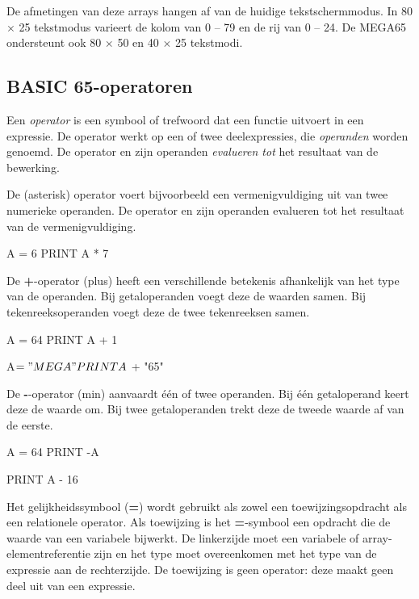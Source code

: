 De afmetingen van deze arrays hangen af van de huidige tekstschermmodus. In 80 $\times$ 25 tekstmodus varieert de kolom van 0 -- 79 en de rij van 0 -- 24. De MEGA65 ondersteunt ook 80 $\times$ 50 en 40 $\times$ 25 tekstmodi.

\subsection{BASIC 65-operatoren}

Een {\em operator} is een symbool of trefwoord dat een functie uitvoert in een expressie. De operator werkt op een of twee deelexpressies, die {\em operanden} worden genoemd. De operator en zijn operanden {\em evalueren tot} het resultaat van de bewerking.

De {\bf *} (asterisk) operator voert bijvoorbeeld een vermenigvuldiging uit van twee numerieke operanden. De operator en zijn operanden evalueren tot het resultaat van de vermenigvuldiging.

\begin{screencode}
A = 6
PRINT A * 7
\end{screencode}

De {\bf +}-operator (plus) heeft een verschillende betekenis afhankelijk van het type van de operanden. Bij getaloperanden voegt deze de waarden samen. Bij tekenreeksoperanden voegt deze de twee tekenreeksen samen.

\begin{screencode}
A = 64
PRINT A + 1

A$ = "MEGA"
PRINT A$ + "65"
\end{screencode}

De {\bf -}-operator (min) aanvaardt één of twee operanden. Bij één getaloperand keert deze de waarde om. Bij twee getaloperanden trekt deze de tweede waarde af van de eerste.

\begin{screencode}
A = 64
PRINT -A

PRINT A - 16
\end{screencode}

Het gelijkheidssymbool ({\bf =}) wordt gebruikt als zowel een toewijzingsopdracht als een relationele operator. Als toewijzing is het {\bf =}-symbool een opdracht die de waarde van een variabele bijwerkt. De linkerzijde moet een variabele of array-elementreferentie zijn en het type moet overeenkomen met het type van de expressie aan de rechterzijde. De toewijzing is geen operator: deze maakt geen deel uit van een expressie.

